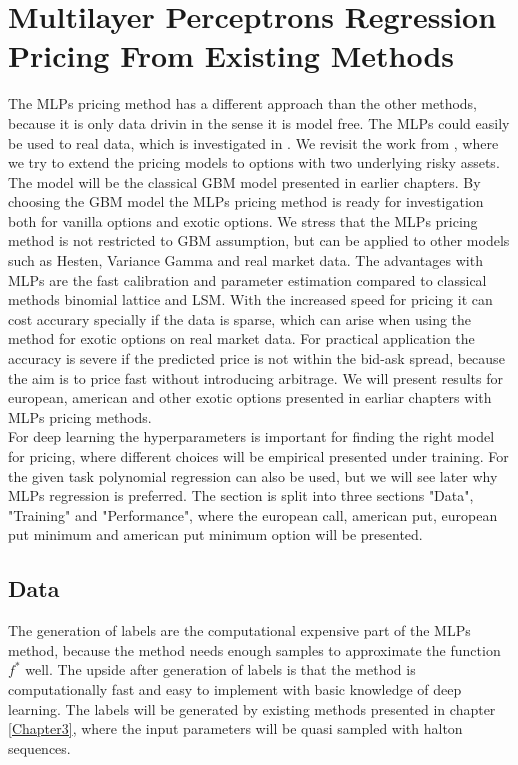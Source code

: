 \section{Multilayer Perceptrons Regression Pricing From Existing Methods}
The MLPs pricing method has a different approach than the other methods, because it is only data drivin in the sense it is model free. The MLPs could easily be used to real data, which is investigated in \parencite{GasparRaquel20}. We revisit the work from \parencite{HirsaAli2019}, where we try to extend the pricing models to options with two underlying risky assets. The model will be the classical GBM model presented in earlier chapters. By choosing the GBM model the MLPs pricing method is ready for investigation both for vanilla options and exotic options. We stress that the MLPs pricing method is not restricted to GBM assumption, but can be applied to other models such as Hesten, Variance Gamma and real market data. The advantages with MLPs are the fast calibration and parameter estimation compared to classical methods binomial lattice and LSM. With the increased speed for pricing it can cost accurary specially if the data is sparse, which can arise when using the method for exotic options on real market data. For practical application the accuracy is severe if the predicted price is not within the bid-ask spread, because the aim is to price fast without introducing arbitrage. We will present results for european, american and other exotic options presented in earliar chapters with MLPs pricing methods.\\

For deep learning the hyperparameters is important for finding the right model for pricing, where different choices will be empirical presented under training. For the given task polynomial regression can also be used, but we will see later why MLPs regression is preferred. The section is split into three sections "Data", "Training" and "Performance", where the european call, american put, european put minimum and american put minimum option will be presented.

\subsection{Data}
The generation of labels are the computational expensive part of the MLPs method, because the method needs enough samples to approximate the function $f^*$ well. The upside after generation of labels is that the method is computationally fast and easy to implement with basic knowledge of deep learning. The labels will be generated by existing methods presented in chapter \ref{Chapter3}, where the input parameters will be quasi sampled with halton sequences.\\


